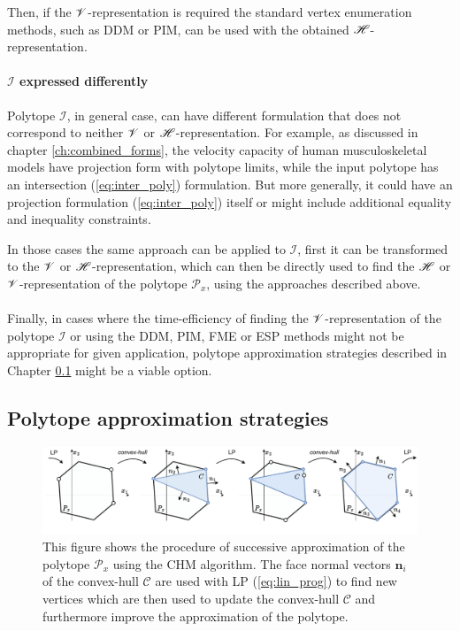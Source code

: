 Then, if the $\mathscr{V}$-representation is required the standard vertex enumeration methods, such as DDM\cite{fukuda_dd} or PIM\cite{avis_pivoting_nodate}, can be used with the obtained $\mathscr{H}$-representation.


\paragraph*{$\mathcal{I}$ expressed differently} Polytope $\mathcal{I}$, in general case, can have different formulation that does not correspond to neither $\mathscr{V}$ or $\mathscr{H}$-representation. For example, as discussed in chapter \ref{ch:combined_forms}, the velocity capacity of human musculoskeletal models have projection form with polytope limits, while the input polytope has an intersection (\ref{eq:inter_poly}) formulation. But more generally, it could have an projection formulation (\ref{eq:inter_poly}) itself or might include additional equality and inequality constraints. 

In those cases the same approach can be applied to $\mathcal{I}$, first it can be transformed to the $\mathscr{V}$ or $\mathscr{H}$-representation, which can then be directly used to find the $\mathscr{H}$ or $\mathscr{V}$-representation of the polytope $\mathcal{P}_x$, using the approaches described above.


\paragraph*{}Finally, in cases where the time-efficiency of finding the $\mathscr{V}$-representation of the polytope $\mathcal{I}$ or using the DDM\cite{fukuda_dd}, PIM\cite{avis_pivoting_nodate}, FME\cite{dantzig1973fourier} or ESP\cite{jones2004equality} methods might not be appropriate for given application, polytope approximation strategies described in Chapter \ref{ch:approximation_algos} might be a viable option.

\subsection{Polytope approximation strategies}
\label{ch:approximation_algos}
 
\begin{figure}[!htb]
    \centering
    \includegraphics[width=\linewidth]{Chapters/imgs/ray_shooting.pdf}
    \caption{This figure shows the procedure of successive approximation of the polytope $\mathcal{P}_x$ using the CHM algorithm. The face normal vectors $\bm{n}_i$ of the convex-hull $\mathcal{C}$ are used with LP (\ref{eq:lin_prog}) to find new vertices which are then used to update the convex-hull $\mathcal{C}$ and furthermore improve the approximation of the polytope.}
    \label{fig:rsm}
\end{figure}

